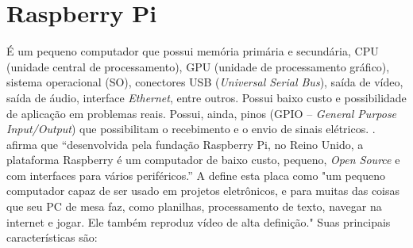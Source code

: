 \section{Raspberry Pi}
\label{secao:raspberry_pi}

É um pequeno computador que possui memória primária e secundária, CPU (unidade central de processamento), GPU (unidade de processamento gráfico), sistema operacional (SO), conectores USB (\textit{Universal Serial Bus}), saída de vídeo, saída de áudio, interface \textit{Ethernet}, entre outros. Possui baixo custo e possibilidade de aplicação em problemas reais. Possui, ainda, pinos (GPIO – \textit{General Purpose Input/Output}) que possibilitam o recebimento e o envio de sinais elétricos. \cite[p.~3]{sheid:2015:raspberry}. 
\citet[p.~19]{coutinho:2016:sistema} afirma que “desenvolvida pela fundação Raspberry Pi, no Reino Unido, a plataforma Raspberry é um computador de baixo custo, pequeno, \textit{Open Source} e com interfaces para vários periféricos.” A \citet{fundacaoraspberry:2017:raspberry} define esta placa como "um pequeno computador capaz de ser usado em projetos eletrônicos, e para muitas das coisas que seu PC de mesa faz, como planilhas, processamento de texto, navegar na internet e jogar. Ele também reproduz vídeo de alta definição." Suas principais características são:

